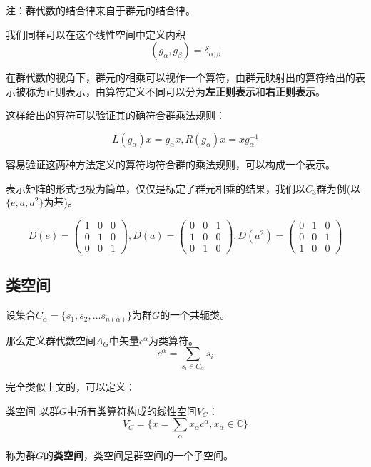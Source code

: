 注：群代数的结合律来自于群元的结合律。

我们同样可以在这个线性空间中定义内积
$$(g_\alpha,g_\beta)=\delta_{\alpha,\beta}$$

在群代数的视角下，群元的相乘可以视作一个算符，由群元映射出的算符给出的表示被称为正则表示，由算符定义不同可以分为\textbf{左正则表示}和\textbf{右正则表示}。

这样给出的算符可以验证其的确符合群乘法规则：

$$L(g_\alpha)x=g_\alpha x,R(g_\alpha)x=xg_\alpha^{-1}$$

容易验证这两种方法定义的算符均符合群的乘法规则，可以构成一个表示。

表示矩阵的形式也极为简单，仅仅是标定了群元相乘的结果，我们以$C_3$群为例(以$\{e,a,a^2\}$为基)。

$$D(e)=\begin{pmatrix}
 1& 0& 0\\
 0 &1 & 0 \\
 0&0&1
 \end{pmatrix},
 D(a)=\begin{pmatrix}
 0&0& 1\\
 1&0 & 0 \\
 0&1&0
 \end{pmatrix},
 D(a^2)=\begin{pmatrix}
 0& 1& 0\\
 0 &0 & 1 \\
 1&0&0
\end{pmatrix}$$

\subsection{类空间}

\begin{definition}{}
设集合$C_\alpha=\{s_1,s_2,...s_{n(\alpha)}\}$为群$G$的一个共轭类。

那么定义群代数空间$A_G$中矢量$c^\alpha$为类算符。
$$c^\alpha=\displaystyle\sum_{s_i\in C_\alpha}s_i$$
\end{definition}

完全类似上文的，可以定义：
\begin{definition}{类空间}
以群$G$中所有类算符构成的线性空间$V_C$：
$$V_C=\{x=\displaystyle\sum_\alpha x_\alpha c^\alpha,x_\alpha \in \mathbb{C}\}$$

称为群$G$的\textbf{类空间}，类空间是群空间的一个子空间。
\end{definition}